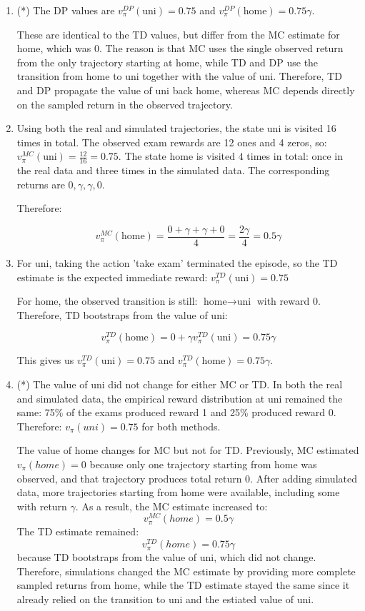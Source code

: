 \documentclass{article}
\begin{document}
\begin{enumerate}
    \item (*) The DP values are $v_{\pi}^{DP}(\text{uni})=0.75$ and $v_{\pi}^{DP}(\text{home})=0.75\gamma$.

    These are identical to the TD values, but differ from the MC estimate for home, which was 0. The reason is that MC uses the single observed return from the only trajectory starting at home, while TD and DP use the transition from home to uni together with the value of uni. Therefore, TD and DP propagate the value of uni back home, whereas MC depends directly on the sampled return in the observed trajectory.

    \item Using both the real and simulated trajectories, the state uni is visited 16 times in total. The observed exam rewards are 12 ones and 4 zeros, so: $v_{\pi}^{MC}(\text{uni})=\frac{12}{16}=0.75.$
    The state $\text{home}$ is visited $4$ times in total: once in the real data and three times in the simulated data. The corresponding returns are $0,\gamma,\gamma,0$.

    Therefore: 
    
    $$
    v_{\pi}^{MC}(\text{home})=\frac{0+\gamma+\gamma+0}{4}=\frac{2\gamma}{4}=0.5\gamma
    $$
    
    \item For uni, taking the action 'take exam' terminated the episode, so the TD estimate is the expected immediate reward: $v_{\pi}^{TD}(\text{uni})=0.75$

    For home, the observed transition is still:  $\text{home}\rightarrow\text{uni}$ with reward $0$. Therefore, TD bootstraps from the value of uni: 

    $$
    v_{\pi}^{TD}(\text{home}) = 0 + \gamma v_{\pi}^{TD}(\text{uni}) = 0.75\gamma
    $$

    This gives us $v_{\pi}^{TD}(\text{uni})=0.75$ and $v_{\pi}^{TD}(\text{home})=0.75\gamma$.

    \item (*) The value of uni did not change for either MC or TD. In both the real and simulated data, the empirical reward distribution at uni remained the same: 75\% of the exams produced reward 1 and 25\% produced reward 0. Therefore: $v_\pi (uni) = 0.75$ for both methods.

    The value of home changes for MC but not for TD. Previously, MC estimated $v_\pi (home) = 0$ because only one trajectory starting from home was observed, and that trajectory produces total return 0. After adding simulated data, more trajectories starting from home were available, including some with return $\gamma$. As a result, the MC estimate increased to: 
    $$
    v_\pi^{MC}(home) = 0.5\gamma
    $$
    The TD estimate remained:
    $$
    v_\pi^{TD}(home) = 0.75\gamma
    $$
    because TD bootstraps from the value of uni, which did not change. Therefore, simulations changed the MC estimate by providing more complete sampled returns from home, while the TD estimate stayed the same since it already relied on the transition to uni and the estiated value of uni.

    
\end{enumerate}
\end{document}
